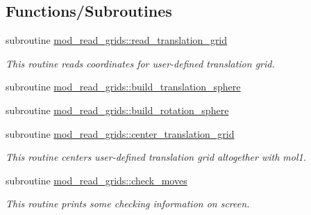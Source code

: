 \subsection*{Functions/\+Subroutines}
\begin{DoxyCompactItemize}
\item 
subroutine \hyperlink{namespacemod__read__grids_af6cb0bee8e3eb7dfbaa4621275b29fa2}{mod\+\_\+read\+\_\+grids\+::read\+\_\+translation\+\_\+grid}
\begin{DoxyCompactList}\small\item\em This routine reads coordinates for user-\/defined translation grid. \end{DoxyCompactList}\item 
subroutine \hyperlink{namespacemod__read__grids_abba14a1f750b2c342d5c5a80be803310}{mod\+\_\+read\+\_\+grids\+::build\+\_\+translation\+\_\+sphere}
\item 
subroutine \hyperlink{namespacemod__read__grids_ae4fb4c515f1f9f5edd3785ca0f509ea4}{mod\+\_\+read\+\_\+grids\+::build\+\_\+rotation\+\_\+sphere}
\item 
subroutine \hyperlink{namespacemod__read__grids_a1e081c6668bb3ea97788ffe4a74f39db}{mod\+\_\+read\+\_\+grids\+::center\+\_\+translation\+\_\+grid}
\begin{DoxyCompactList}\small\item\em This routine centers user-\/defined translation grid altogether with mol1. \end{DoxyCompactList}\item 
subroutine \hyperlink{namespacemod__read__grids_a318177c120a409fe4cef7d1785b626ac}{mod\+\_\+read\+\_\+grids\+::check\+\_\+moves}
\begin{DoxyCompactList}\small\item\em This routine prints some checking information on screen. \end{DoxyCompactList}\end{DoxyCompactItemize}
